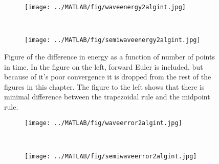 \begin{figure}[H]
        \centering
        \begin{subfigure}[b]{0.45\textwidth}
                \texttt{[image: ../MATLAB/fig/waveenergy2algint.jpg]}
                \caption{  }
                \label{fig:errora}
        \end{subfigure}%
        ~
        \begin{subfigure}[b]{0.45\textwidth}
                \texttt{[image: ../MATLAB/fig/semiwaveenergy2algint.jpg]}
                \caption{  }
                \label{fig:errorb}
        \end{subfigure}
        \caption{Figure of the difference in energy as a function of number of points in time. In the figure on the left, forward Euler is included, but because of it's poor convergence it is dropped from the rest of the figures in this chapter. The figure to the left shows that there is minimal difference between the trapezoidal rule and the midpoint rule. }
        \label{fig:energy}
\end{figure}

\begin{figure}[H]
        \centering
        \begin{subfigure}[b]{0.45\textwidth}
                \texttt{[image: ../MATLAB/fig/waveerror2algint.jpg]}
                \caption{  }
                \label{fig:energya}
        \end{subfigure}%
        ~
        \begin{subfigure}[b]{0.45\textwidth}
                \texttt{[image: ../MATLAB/fig/semiwaveerror2algint.jpg]}
                \caption{  }
               \label{fig:energyb}
        \end{subfigure}
        \caption{}
        \label{fig:error}
\end{figure}





